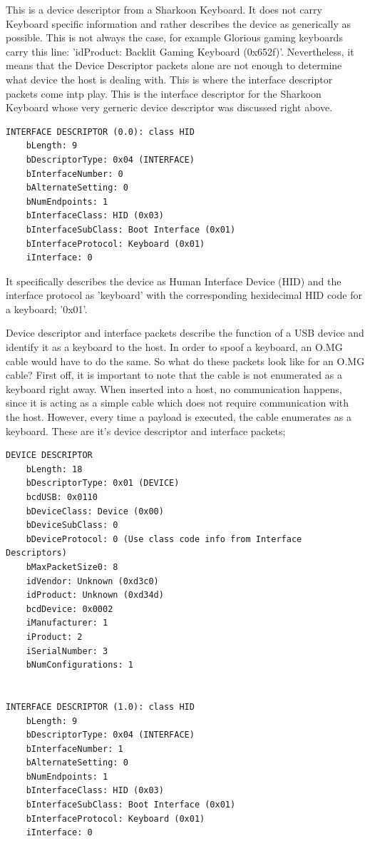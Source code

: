 This is a device descriptor from a Sharkoon Keyboard. It does not carry Keyboard specific information and rather describes the device as generically as possible. This is not always the case, for example Glorious gaming keyboards carry this line: 'idProduct: Backlit Gaming Keyboard (0x652f)'. Nevertheless,
it means that the Device Descriptor packets alone are not enough to determine what device the host is dealing with. This is where the interface descriptor packets come intp play.
This is the interface descriptor for the Sharkoon Keyboard whose very gerneric device descriptor was discussed right above.

\begin{lstlisting}
INTERFACE DESCRIPTOR (0.0): class HID
    bLength: 9
    bDescriptorType: 0x04 (INTERFACE)
    bInterfaceNumber: 0
    bAlternateSetting: 0
    bNumEndpoints: 1
    bInterfaceClass: HID (0x03)
    bInterfaceSubClass: Boot Interface (0x01)
    bInterfaceProtocol: Keyboard (0x01)
    iInterface: 0
\end{lstlisting}

It specifically describes the device as Human Interface Device (HID)  and the interface protocol as 'keyboard' with the corresponding hexidecimal HID code for a keyboard; '0x01'.

Device descriptor and interface packets describe the function of a USB device and identify it as a keyboard to the host. In order to spoof a keyboard, an O.MG cable would have to do the same. So what do these packets look like for an O.MG cable?
First off, it is important to note that the cable is not enumerated as a keyboard right away. When inserted into a host, no communication happens, since it is acting as a simple cable which does not require communication with the host. However, every time a payload is executed, the cable enumerates as a keyboard.
These are it's device descriptor and interface packets;

\begin{lstlisting}
DEVICE DESCRIPTOR
    bLength: 18
    bDescriptorType: 0x01 (DEVICE)
    bcdUSB: 0x0110
    bDeviceClass: Device (0x00)
    bDeviceSubClass: 0
    bDeviceProtocol: 0 (Use class code info from Interface Descriptors)
    bMaxPacketSize0: 8
    idVendor: Unknown (0xd3c0)
    idProduct: Unknown (0xd34d)
    bcdDevice: 0x0002
    iManufacturer: 1
    iProduct: 2
    iSerialNumber: 3
    bNumConfigurations: 1


INTERFACE DESCRIPTOR (1.0): class HID
    bLength: 9
    bDescriptorType: 0x04 (INTERFACE)
    bInterfaceNumber: 1
    bAlternateSetting: 0
    bNumEndpoints: 1
    bInterfaceClass: HID (0x03)
    bInterfaceSubClass: Boot Interface (0x01)
    bInterfaceProtocol: Keyboard (0x01)
    iInterface: 0
\end{lstlisting}

